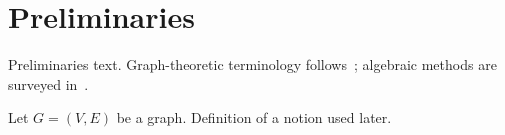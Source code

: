 \chapter{Preliminaries}
\label{ch:preliminaries}

Preliminaries text.
Graph-theoretic terminology follows~\cite{Diestel2025}; algebraic methods are surveyed in~\cite{GodsilRoyle2001}.

\begin{definition}[Placeholder]
\label{def:placeholder}
Let $G = (V, E)$ be a graph.
Definition of a notion used later.
\end{definition}
